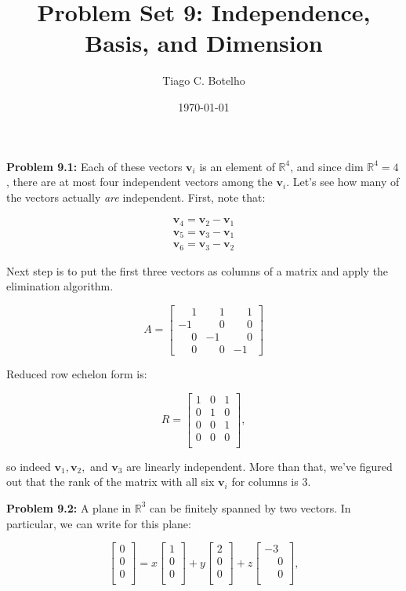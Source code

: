 \documentclass{article}
\title{Problem Set 9: Independence, Basis, and Dimension}
\author{Tiago C. Botelho}
\date{\today}
\begin{document}
\maketitle

\noindent \textbf{Problem 9.1:} Each of these vectors $\mathbf{v}_i$ is an element of $\mathbb{R}^{4}$, and since $\text{dim }\mathbb{R}^{4} = 4$, there are at most four independent vectors among the $\mathbf{v}_i$. Let's see how many of the vectors actually \textit{are} independent. First, note that:

\begin{align*}
\mathbf{v}_4 = \mathbf{v}_2 - \mathbf{v}_1\\
\mathbf{v}_5 = \mathbf{v}_3 - \mathbf{v}_1\\
\mathbf{v}_6 = \mathbf{v}_3 - \mathbf{v}_2
\end{align*}

Next step is to put the first three vectors as columns of a matrix and apply the elimination algorithm.

\[
A = \begin{bmatrix}
\phantom{-}1 & \phantom{-}1 & \phantom{-}1\\
-1 & \phantom{-}0 & \phantom{-}0\\
\phantom{-}0 & -1 & \phantom{-}0\\
\phantom{-}0 & \phantom{-}0 & -1
\end{bmatrix}
\]

Reduced row echelon form is:

\[
R = \begin{bmatrix}
1 & 0 & 1\\
0 & 1 & 0\\
0 & 0 & 1\\
0 & 0 & 0\\
\end{bmatrix},
\]

so indeed $\mathbf{v}_1, \mathbf{v}_2,$ and $\mathbf{v}_3$ are linearly independent. More than that, we've figured out that the rank of the matrix with all six $\mathbf{v}_i$ for columns is 3.

\noindent \textbf{Problem 9.2:} A plane in $\mathbb{R}^{3}$ can be finitely spanned by two vectors. In particular, we can write for this plane:

\[
\begin{bmatrix}
0\\
0\\
0\\
\end{bmatrix}
=
x\begin{bmatrix}
1\\
0\\
0\\
\end{bmatrix}
+
y\begin{bmatrix}
2\\
0\\
0\\
\end{bmatrix}
+
z\begin{bmatrix}
-3\\
\phantom{-}0\\
\phantom{-}0\\
\end{bmatrix},
\]
\end{document}
